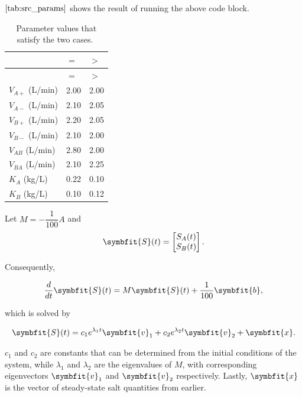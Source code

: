 \(\autoref{tab:src_params}\) shows the result of running the above code
block.

\begin{longtable}[]{@{}lll@{}}
\caption{Parameter values that satisfy the two cases.
\(\label{tab:src_params}\)}\tabularnewline
\toprule\noalign{}
& \(=\) & \(>\) \\
\midrule\noalign{}
\endfirsthead
\toprule\noalign{}
& \(=\) & \(>\) \\
\midrule\noalign{}
\endhead
\bottomrule\noalign{}
\endlastfoot
\(V_{A+}\) (L/min) & 2.00 & 2.00 \\
\(V_{A-}\) (L/min) & 2.10 & 2.05 \\
\(V_{B+}\) (L/min) & 2.20 & 2.05 \\
\(V_{B-}\) (L/min) & 2.10 & 2.00 \\
\(V_{AB}\) (L/min) & 2.80 & 2.00 \\
\(V_{BA}\) (L/min) & 2.10 & 2.25 \\
\(K_A\) (kg/L) & 0.22 & 0.10 \\
\(K_B\) (kg/L) & 0.10 & 0.12 \\
\end{longtable}

Let \(M=-\dfrac{1}{100}A\) and \begin{equation}
  \symbfit{S}(t) = \begin{bmatrix}
                  S_A(t) \\ S_B(t)
                \end{bmatrix}.
\end{equation}

Consequently,

\begin{align}
  \frac{d}{dt} \symbfit{S}(t) = M \symbfit{S}(t) + \frac{1}{100}\symbfit{b},
\end{align}

which is solved by

\begin{align}
  \symbfit{S}(t) = c_1e^{\lambda_1t}\symbfit{v}_1 + c_2e^{\lambda_2t}\symbfit{v}_2 + \symbfit{x}. \label{eq:trans}
\end{align}

\(c_1\) and \(c_2\) are constants that can be determined from the
initial conditions of the system, while \(\lambda_1\) and \(\lambda_2\)
are the eigenvalues of \(M\), with corresponding eigenvectors
\(\symbfit{v}_1\) and \(\symbfit{v}_2\) respectively. Lastly,
\(\symbfit{x}\) is the vector of steady-state salt quantities from
earlier.

